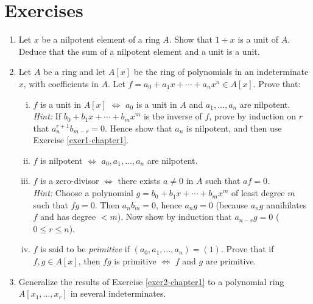 \section*{Exercises}

\begin{enumerate}
    \item \label{exer1-chapter1}Let $x$ be a nilpotent element of a ring $A$. Show that $1 + x$ is a unit of $A$. Deduce that the sum of a nilpotent element and a unit is a unit.

    \item \label{exer2-chapter1}Let $A$ be a ring and let $A[x]$ be the ring of polynomials in an indeterminate $x$, with coefficients in $A$. Let $f = a_0 + a_1 x + \cdots + a_n x^n \in A[x]$. Prove that:
    \begin{enumerate}[i)]
        \item $f$ is a unit in $A[x]$ $\iff$ $a_0$ is a unit in $A$ and $a_1, \ldots, a_n$ are nilpotent.\\
        \textit{Hint:} If $b_0 + b_1 x + \cdots + b_m x^m$ is the inverse of $f$, prove by induction on $r$ that $a_n^{r+1} b_{m-r} = 0$. Hence show that $a_n$ is nilpotent, and then use Exercise \ref{exer1-chapter1}.
        \item $f$ is nilpotent $\iff$ $a_0, a_1, \ldots, a_n$ are nilpotent.
        \item $f$ is a zero-divisor $\iff$ there exists $a \neq 0$ in $A$ such that $af = 0$.\\
        \textit{Hint:} Choose a polynomial $g = b_0 + b_1 x + \cdots + b_m x^m$ of least degree $m$ such that $fg = 0$. Then $a_n b_m = 0$, hence $a_n g = 0$ (because $a_n g$ annihilates $f$ and has degree $< m$). Now show by induction that $a_{n-r} g = 0$ ($0 \leq r \leq n$).
        \item $f$ is said to be \emph{primitive} if $(a_0, a_1, \ldots, a_n) = (1)$. Prove that if $f, g \in A[x]$, then $fg$ is primitive $\iff$ $f$ and $g$ are primitive.
    \end{enumerate}

    \item \label{exer3-chapter1}Generalize the results of Exercise \ref{exer2-chapter1} to a polynomial ring $A[x_1, \ldots, x_r]$ in several indeterminates.


\end{enumerate}
